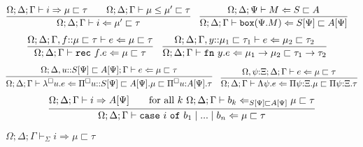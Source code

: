 \documentclass[letterpaper, 11pt]{article}
\newcommand{\Rar}{\Rightarrow}
\newcommand{\Lar}{\Leftarrow}
\newcommand{\rar}{\rightarrow}
\newcommand{\rec}{\texttt{rec}}
\newcommand{\fn}{\texttt{fn}}
\newcommand{\case}{\texttt{case}}
\newcommand{\of}{\texttt{of}}
\newcommand{\bbox}{\texttt{box}}
\begin{document}
    \begin{align*}
      & \infer{\Omega; \Delta; \Gamma \vdash i \Lar \mu' \sqsubset \tau}
        {
          \Omega; \Delta; \Gamma \vdash i \Rar \mu \sqsubset \tau
          &&
          \Omega; \Delta; \Gamma \vdash \mu \leq \mu' \sqsubset \tau
        } &
      & \infer{\Omega; \Delta; \Gamma \vdash \bbox(\Psi. M) \Lar S[\Psi] \sqsubset A[\Psi]}
        {
          \Omega; \Delta; \Psi \vdash M \Lar S \sqsubset A
        }
    \end{align*}
    \begin{align*}
      & \infer{\Omega; \Delta; \Gamma \vdash \rec \ f.e \Lar \mu \sqsubset \tau}
        {
          \Omega; \Delta; \Gamma, f{::}\mu \sqsubset \tau \vdash e \Lar \mu \sqsubset \tau
        } &
      & \infer{\Omega; \Delta; \Gamma \vdash \fn \ y.e \Lar \mu_1 \rar \mu_2 \sqsubset \tau_1 \rar \tau_2}
        {
          \Omega; \Delta; \Gamma, y{::}\mu_1 \sqsubset \tau_1 \vdash e \Lar \mu_2 \sqsubset \tau_2
        }
    \end{align*}
    \begin{align*}
      & \infer{\Omega; \Delta; \Gamma \vdash \lambda^\square u.e \Lar \Pi^\square u{::}S[\Psi] \sqsubset A[\Psi].\mu \sqsubset \Pi^\square u{:}A[\Psi]. \tau}
        {
          \Omega; \Delta, u{::}S[\Psi] \sqsubset A[\Psi]; \Gamma \vdash e \Lar \mu \sqsubset \tau
        }
      & \infer{\Omega; \Delta; \Gamma \vdash \Lambda \psi. e \Lar \Pi \psi{:}\Xi.\mu \sqsubset \Pi \psi {:} \Xi. \tau}
        {
          \Omega, \psi{:}\Xi; \Delta; \Gamma \vdash e \Lar \mu \sqsubset \tau
        }
    \end{align*}
    \begin{align*}
      \infer{\Omega; \Delta; \Gamma \vdash \case \ i \ \of \ b_1 \mid ... \mid b_n \Lar \mu \sqsubset \tau}
            {
              \Omega; \Delta; \Gamma \vdash i \Rar A[\Psi]
              &&
              \text{for all } k \ \Omega; \Delta; \Gamma \vdash b_k \Lar_{S[\Psi] \sqsubset A[\Psi]} \mu \sqsubset \tau
            }
    \end{align*}

    $\boxed{\Omega; \Delta; \Gamma \vdash_\Sigma i \Rar \mu \sqsubset \tau}$
    
\end{document}
